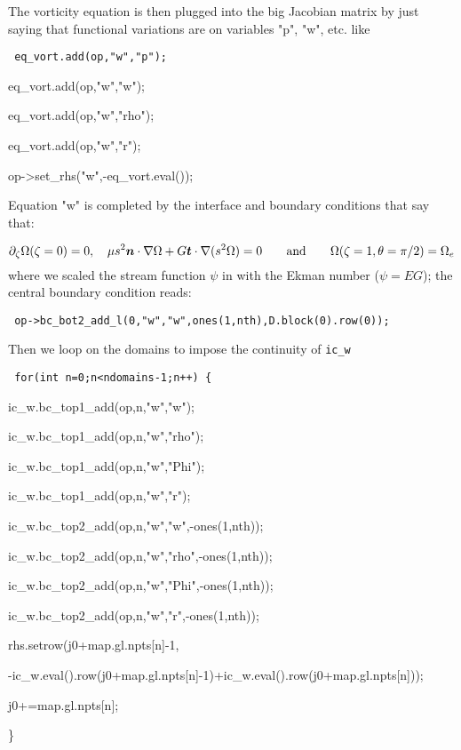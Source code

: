 The vorticity equation is then plugged into the big Jacobian matrix by just
saying that  functional variations are on variables "p", "w", etc. like

\begin{center}
{\tt
        eq\_vort.add(op,"w","p"); \par
        eq\_vort.add(op,"w","w"); \par
        eq\_vort.add(op,"w","rho"); \par
        eq\_vort.add(op,"w","r"); \par
        op->set\_rhs("w",-eq\_vort.eval()); \par
}

\end{center}
Equation "w" is completed by the interface and boundary conditions that
say that:

\[ \partial_\zeta\Omega(\zeta=0) = 0,\quad  \mu s^2\vn\cdot\na\Omega +
G\vec{t}\cdot\na(s^2\Omega)=0 \andet \Omega(\zeta=1,\theta=\pi/2) =
\Omega_e\]
where we scaled the stream function $\psi$ in  with the Ekman
number ($\psi=EG$); the central boundary condition reads:
\bigskip

\centerline{\tt
op->bc\_bot2\_add\_l(0,"w","w",ones(1,nth),D.block(0).row(0));}
\bigskip

Then we loop on the domains to impose the continuity of {\tt ic\_w}

\begin{center}
{\tt
        for(int n=0;n<ndomains-1;n++) \{  \par
                ic\_w.bc\_top1\_add(op,n,"w","w");  \par
                ic\_w.bc\_top1\_add(op,n,"w","rho");  \par
                ic\_w.bc\_top1\_add(op,n,"w","Phi");  \par
                ic\_w.bc\_top1\_add(op,n,"w","r");  \par
                ic\_w.bc\_top2\_add(op,n,"w","w",-ones(1,nth));  \par
                ic\_w.bc\_top2\_add(op,n,"w","rho",-ones(1,nth));  \par
                ic\_w.bc\_top2\_add(op,n,"w","Phi",-ones(1,nth));  \par
                ic\_w.bc\_top2\_add(op,n,"w","r",-ones(1,nth));  \par
                rhs.setrow(j0+map.gl.npts[n]-1,  \par
-ic\_w.eval().row(j0+map.gl.npts[n]-1)+ic\_w.eval().row(j0+map.gl.npts[n]));\par
  \par
                j0+=map.gl.npts[n];  \par
        \}  \par
}
\end{center}

